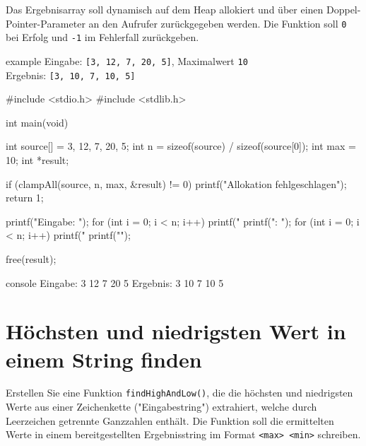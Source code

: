 Das Ergebnisarray soll dynamisch auf dem Heap allokiert und über einen
Doppel-Pointer-Parameter an den Aufrufer zurückgegeben werden. Die Funktion soll
\texttt{0} bei Erfolg und \texttt{-1} im Fehlerfall
zurückgeben.

\begin{myboxtext}[title=Beispiel]{example}
Eingabe: \texttt{[3, 12, 7, 20, 5]}, Maximalwert \texttt{10}\\
Ergebnis: \texttt{[3, 10, 7, 10, 5]}
\end{myboxtext}

\Vorlage
\begin{codebox}[lang=c, fontsize=\small]
#include <stdio.h>
#include <stdlib.h>

int main(void) {
    int source[] = {3, 12, 7, 20, 5};
    int n = sizeof(source) / sizeof(source[0]);
    int max = 10;
    int *result;

    if (clampAll(source, n, max, &result) != 0) {
        printf("Allokation fehlgeschlagen\n");
        return 1;
    }

    printf("Eingabe:   ");
    for (int i = 0; i < n; i++) printf("%
    printf("\nErgebnis:  ");
    for (int i = 0; i < n; i++) printf("%
    printf("\n");

    free(result);
}
\end{codebox}

\begin{mybox}[Bildschirmausgabe]{console}
Eingabe:   3 12 7 20 5
Ergebnis:  3 10 7 10 5
\end{mybox}




\chapter{Höchsten und niedrigsten Wert in einem String finden}

\vspace{10pt}

Erstellen Sie eine Funktion \texttt{findHighAndLow()}, die die höchsten
und niedrigsten Werte aus einer Zeichenkette ("Eingabestring") extrahiert,
welche durch Leerzeichen getrennte Ganzzahlen enthält. Die Funktion soll die
ermittelten Werte in einem bereitgestellten Ergebnisstring im Format
\texttt{<max> <min>} schreiben.

